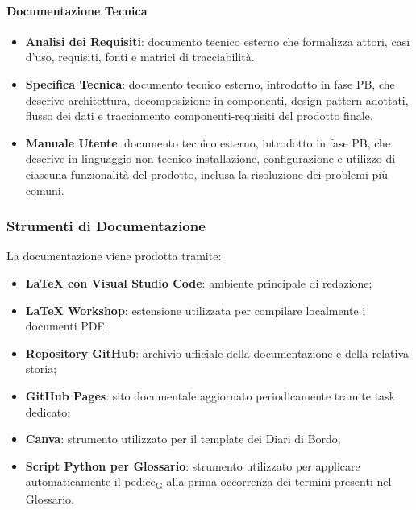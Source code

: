 \paragraph{Documentazione Tecnica}

\begin{itemize}
    \item \textbf{Analisi dei Requisiti}: documento tecnico esterno che formalizza
    attori, casi d'uso, requisiti, fonti e matrici di tracciabilità.

    \item \textbf{Specifica Tecnica}: documento tecnico esterno, introdotto in fase
    PB, che descrive architettura, decomposizione in componenti, design pattern
    adottati, flusso dei dati e tracciamento componenti-requisiti del prodotto
    finale.

    \item \textbf{Manuale Utente}: documento tecnico esterno, introdotto in fase
    PB, che descrive in linguaggio non tecnico installazione, configurazione e
    utilizzo di ciascuna funzionalità del prodotto, inclusa la risoluzione dei
    problemi più comuni.
\end{itemize}


\subsubsection{Strumenti di Documentazione}
\label{sec:strumenti-doc}

La documentazione viene prodotta tramite:

\begin{itemize}
    \item \textbf{\LaTeX{} con Visual Studio Code}: ambiente principale di redazione;

    \item \textbf{LaTeX Workshop}: estensione utilizzata per compilare localmente i
    documenti PDF;

    \item \textbf{Repository GitHub}: archivio ufficiale della documentazione e della
    relativa storia;

    \item \textbf{GitHub Pages}: sito documentale aggiornato periodicamente tramite
    task dedicato;

    \item \textbf{Canva}: strumento utilizzato per il template dei Diari di Bordo;

    \item \textbf{Script Python per Glossario}: strumento utilizzato per applicare
    automaticamente il pedice\textsubscript{G} alla prima occorrenza dei termini
    presenti nel Glossario.
\end{itemize}

